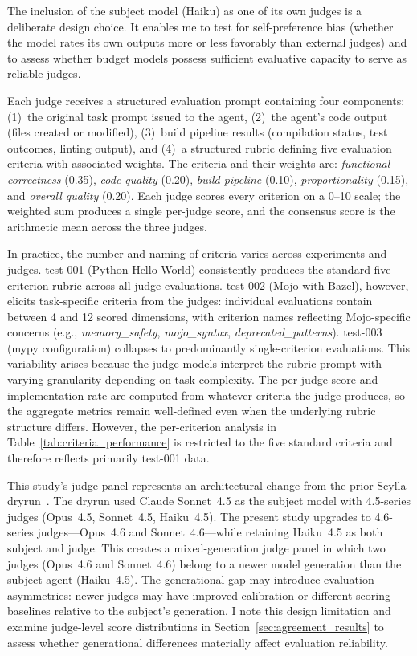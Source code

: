 \documentclass[11pt]{article}
\begin{document}
The inclusion of the subject model (Haiku) as one of its own judges is a
deliberate design choice. It enables me to test for self-preference bias
(whether the model rates its own outputs more or less favorably than external
judges) and to assess whether budget models possess sufficient evaluative
capacity to serve as reliable judges.

Each judge receives a structured evaluation prompt containing four components:
(1)~the original task prompt issued to the agent, (2)~the agent's code output
(files created or modified), (3)~build pipeline results (compilation status,
test outcomes, linting output), and (4)~a structured rubric defining five
evaluation criteria with associated weights. The criteria and their weights are:
\emph{functional correctness} (0.35), \emph{code quality} (0.20),
\emph{build pipeline} (0.10), \emph{proportionality} (0.15), and
\emph{overall quality} (0.20). Each judge scores every criterion on a 0--10
scale; the weighted sum produces a single per-judge score, and the consensus
score is the arithmetic mean across the three judges.

In practice, the number and naming of criteria varies across experiments and
judges. test-001 (Python Hello World) consistently produces the standard
five-criterion rubric across all judge evaluations. test-002 (Mojo with Bazel),
however, elicits task-specific criteria from the judges: individual evaluations
contain between 4 and 12 scored dimensions, with criterion names reflecting
Mojo-specific concerns (e.g., \emph{memory\_safety}, \emph{mojo\_syntax},
\emph{deprecated\_patterns}). test-003 (mypy configuration) collapses to
predominantly single-criterion evaluations. This variability arises because the
judge models interpret the rubric prompt with varying granularity depending on
task complexity. The per-judge score and implementation rate are computed from
whatever criteria the judge produces, so the aggregate metrics remain
well-defined even when the underlying rubric structure differs. However, the
per-criterion analysis in Table~\ref{tab:criteria_performance} is restricted to
the five standard criteria and therefore reflects primarily test-001 data.

This study's judge panel represents an architectural change from the prior
Scylla dryrun~\cite{scylla2026dryrun}. The dryrun used Claude Sonnet~4.5 as
the subject model with 4.5-series judges (Opus~4.5, Sonnet~4.5, Haiku~4.5).
The present study upgrades to 4.6-series judges---Opus~4.6 and
Sonnet~4.6---while retaining Haiku~4.5 as both subject and judge. This creates
a mixed-generation judge panel in which two judges (Opus~4.6 and Sonnet~4.6)
belong to a newer model generation than the subject agent (Haiku~4.5). The
generational gap may introduce evaluation asymmetries: newer judges may have
improved calibration or different scoring baselines relative to the subject's
generation. I note this design limitation and examine judge-level score
distributions in Section~\ref{sec:agreement_results} to assess whether
generational differences materially affect evaluation reliability.
\end{document}
